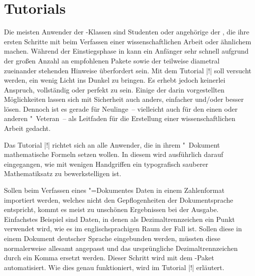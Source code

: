 \chapter{Tutorials}
%
%
Die meisten Anwender der \TUDScript-Klassen sind Studenten oder angehörige der 
\TnUD, die ihre ersten Schritte mit  beim Verfassen einer 
wissenschaftlichen Arbeit oder ähnlichem machen. Während der Einstiegsphase in 
 kann ein Anfänger sehr schnell aufgrund der großen Anzahl an 
empfohlenen Pakete sowie der teilweise diametral zueinander stehenden Hinweise 
überfordert sein. Mit dem Tutorial |!| soll versucht werden, 
ein wenig Licht ins Dunkel zu bringen. Es erhebt jedoch keinerlei Anspruch, 
vollständig oder perfekt zu sein. Einige der darin vorgestellten Möglichkeiten 
lassen sich mit Sicherheit auch anders, einfacher und/oder besser lösen. 
Dennoch ist es gerade für Neulinge~-- vielleicht auch für den einen oder 
anderen "~Veteran~-- als Leitfaden für die Erstellung einer 
wissenschaftlichen Arbeit gedacht.

%
%
Das Tutorial |!| richtet sich an alle Anwender, die in ihrem 
"~Dokument mathematische Formeln setzen wollen. In diesem wird 
ausführlich darauf eingegangen, wie mit wenigen Handgriffen ein typografisch 
sauberer Mathematiksatz zu bewerkstelligen ist.

%
%
%
Sollen beim Verfassen eines "=Dokumentes Daten in einem 
Zahlenformat importiert werden, welches nicht den Gepflogenheiten der 
Dokumentsprache entspricht, kommt es meist zu unschönen Ergebnissen bei der 
Ausgabe. Einfachstes Beispiel sind Daten, in denen als Dezimaltrennzeichen ein 
Punkt verwendet wird, wie es im englischsprachigen Raum der Fall ist. Sollen 
diese in einem Dokument deutscher Sprache eingebunden werden, müssten diese 
normalerweise allesamt angepasst und das ursprüngliche Dezimaltrennzeichen 
durch ein Komma ersetzt werden. Dieser Schritt wird mit dem \TUDScript-Paket 
 automatisiert. Wie dies genau funktioniert, wird im Tutorial 
|!| erläutert.
%
